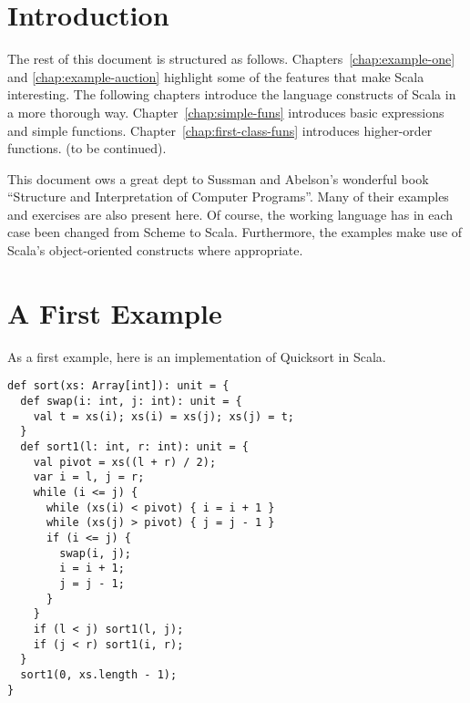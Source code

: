 \documentclass[a4paper,12pt,twoside,titlepage]{book}
\begin{document}
\frontmatter
\makedoctitle
\clearemptydoublepage
\tableofcontents
\mainmatter
\sloppy

\chapter{\label{chap:intro}Introduction}



The rest of this document is structured as
follows. Chapters~\ref{chap:example-one} and
\ref{chap:example-auction} highlight some of the features that make
Scala interesting. The following chapters introduce the language
constructs of Scala in a more thorough
way. Chapter~\ref{chap:simple-funs} introduces basic expressions and
simple functions. Chapter~\ref{chap:first-class-funs} introduces
higher-order functions. (to be continued).

This document ows a great dept to Sussman and Abelson's wonderful book
``Structure and Interpretation of Computer
Programs''\cite{abelson-sussman:structure}. Many of their examples and
exercises are also present here. Of course, the working language has
in each case been changed from Scheme to Scala. Furthermore, the
examples make use of Scala's object-oriented constructs where
appropriate.


\chapter{\label{chap:example-one}A First Example}

As a first example, here is an implementation of Quicksort in Scala.

\begin{lstlisting}
def sort(xs: Array[int]): unit = {
  def swap(i: int, j: int): unit = {
    val t = xs(i); xs(i) = xs(j); xs(j) = t;
  }
  def sort1(l: int, r: int): unit = {
    val pivot = xs((l + r) / 2);
    var i = l, j = r;
    while (i <= j) {
      while (xs(i) < pivot) { i = i + 1 }
      while (xs(j) > pivot) { j = j - 1 }
      if (i <= j) { 
        swap(i, j);
        i = i + 1;
        j = j - 1;
      }
    } 
    if (l < j) sort1(l, j);
    if (j < r) sort1(i, r);
  }
  sort1(0, xs.length - 1);
}
\end{lstlisting}
\end{document}
